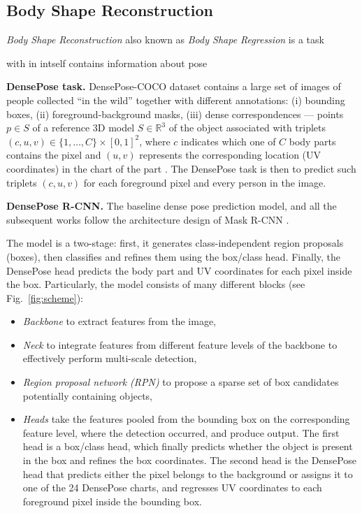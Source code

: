 \subsection{Body Shape Reconstruction}

\textit{Body Shape Reconstruction} also known as \textit{Body Shape Regression} is a task 
 
 with in intself contains information about pose


\noindent 
\textbf{DensePose task.} DensePose-COCO dataset contains a large set of images of people collected ``in the wild'' together with different annotations: (i) bounding boxes, (ii) foreground-background masks, (iii) dense correspondences --- points $p \in S$ of a reference 3D model $S\in\mathbb{R}^3$ of the object associated with triplets $(c, u, v) \in\{1, \ldots, C\} \times[0,1]^{2}$, where $c$ indicates which one of $C$ body parts contains the pixel and $(u,v)$ represents the corresponding location (UV coordinates) in the chart of the part \cite{smpl}.
The DensePose task is then to predict such triplets $(c, u, v)$ for each foreground pixel and every person in the image.
\newline

\noindent \textbf{DensePose R-CNN.} The baseline dense pose prediction model, and all the subsequent works \cite{parsing, uncertainty, monkeys} follow the architecture design of Mask R-CNN \cite{maskrcnn}.

The model is a two-stage: first, it generates class-independent region proposals (boxes), then classifies and refines them using the box/class head. Finally, the DensePose head predicts the body part and UV coordinates for each pixel inside the box. Particularly, the model consists of many different blocks (see Fig.~\ref{fig:scheme}):
\begin{itemize}
    \item \textit{Backbone} to extract features from the image,
    \item \textit{Neck} to integrate features from different feature levels of the backbone to effectively perform multi-scale detection,
    \item \textit{Region proposal network (RPN)} to propose a sparse set of box candidates potentially containing objects,
    \item \textit{Heads} take the features pooled from the bounding box on the corresponding feature level, where the detection occurred, and produce output. The first head is a box/class head, which finally predicts whether the object is present in the box and refines the box coordinates. The second head is the DensePose head that predicts either the pixel belongs to the background or assigns it to one of the 24 DensePose charts, and regresses UV coordinates to each foreground pixel inside the bounding box.
\end{itemize}

